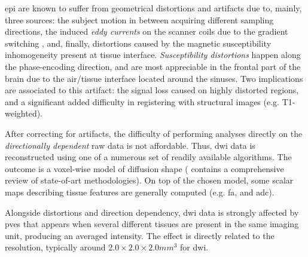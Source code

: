 \Gls{epi} are known to suffer from geometrical distortions and artifacts
due to, mainly, three sources: the subject motion in between acquiring 
different sampling directions, the induced \emph{eddy currents} on the scanner 
coils due to the gradient switching \citep{obrien_3d_2013}, and, finally, 
distortions caused by the magnetic susceptibility inhomogeneity
present at tissue interface. \emph{Susceptibility distortions} happen along the 
phase-encoding direction, and are most appreciable in the frontal part of 
the brain due to the air/tissue interface located around the sinuses.
Two implications are associated to this artifact: the signal loss caused on
highly distorted regions, and a significant added difficulty in 
registering with structural images (e.g. T1-weighted).

After correcting for artifacts, the difficulty of performing analyses directly
on the \emph{directionally dependent} raw data is not affordable. Thus, 
\gls{dwi} data is reconstructed using one of a numerous set of readily 
available algorithms. The outcome is a voxel-wise model of diffusion shape 
(\citep{daducci_quantitative_2013} contains a comprehensive review of 
state-of-art methodologies). On top of the
chosen model, some scalar maps describing tissue features are generally
computed (e.g. \gls*{fa}, and \gls*{adc}).

Alongside distortions and direction dependency, \gls{dwi} data is strongly 
affected by \glspl{pve} \citep{alexander_analysis_2001} that appears when
several different tissues are present in the same imaging unit, producing
an averaged intensity. The effect is directly related to the resolution,
typically around $2.0\times2.0\times2.0mm^3$ for \gls{dwi}.


